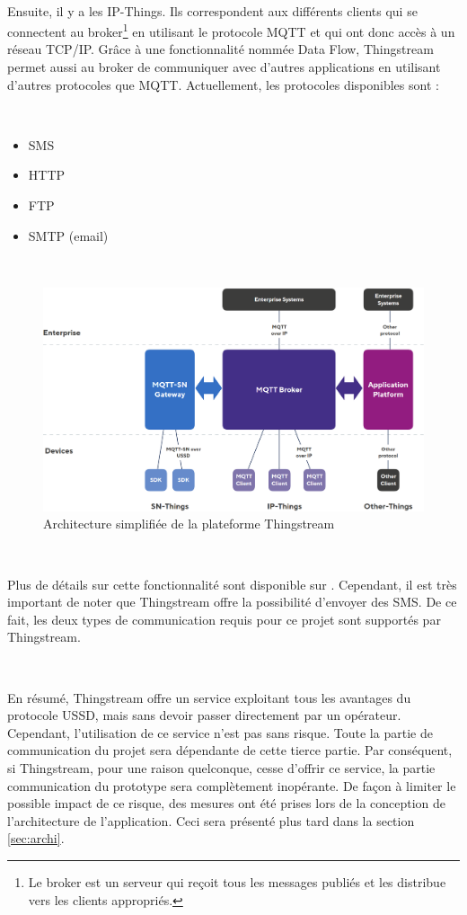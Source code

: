 ~

\noindent
Ensuite, il y a les IP-Things. Ils correspondent aux différents clients qui se connectent au broker\footnote{Le broker est un serveur qui reçoit tous les messages publiés et les distribue vers les clients appropriés.} en utilisant le protocole MQTT et qui ont donc accès à un réseau TCP/IP. Grâce à une fonctionnalité nommée Data Flow, Thingstream permet aussi au broker de communiquer avec d'autres applications en utilisant d'autres protocoles que MQTT. Actuellement, les protocoles disponibles sont :

~

\begin{itemize}
  \item SMS
  \item HTTP
  \item FTP
  \item SMTP (email)
\end{itemize}

~

\begin{figure}[ht!]
  \includegraphics[width=\textwidth]{img/el_prototype/thingstream_archi.png}
  \caption{Architecture simplifiée de la plateforme Thingstream \cite{thing_archi}}
  \label{fig:thing_archi}
\end{figure}
~

\noindent
Plus de détails sur cette fonctionnalité sont disponible sur \cite{thing_dataflow}. Cependant, il est très important de noter que Thingstream offre la possibilité d'envoyer des SMS. De ce fait, les deux types de communication requis pour ce projet sont supportés par Thingstream.

~

\noindent
En résumé, Thingstream offre un service exploitant tous les avantages du protocole USSD, mais sans devoir passer directement par un opérateur. Cependant, l'utilisation de ce service n'est pas sans risque. Toute la partie de communication du projet sera dépendante de cette tierce partie. Par conséquent, si Thingstream, pour une raison quelconque, cesse d'offrir ce service, la partie communication du prototype sera complètement inopérante. De façon à limiter le possible impact de ce risque, des mesures ont été prises lors de la conception de l'architecture de l'application. Ceci sera présenté plus tard dans la section \ref{sec:archi}.

